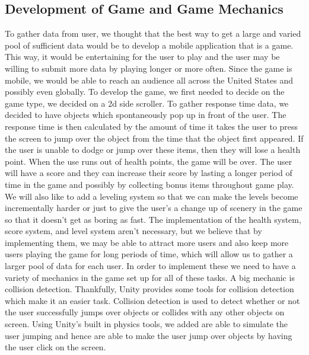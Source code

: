 \documentclass[a4wide]{article}
\begin{document}
\subsection{Development of Game and Game Mechanics}
\- To gather data from user, we thought that the best way to get a large and varied pool of sufficient data would be to develop a mobile application that is a game. This way, it would be entertaining for the user to play and the user may be willing to submit more data by playing longer or more often. Since the game is mobile, we would be able to reach an audience all across the United States and possibly even globally.\newline
\- To develop the game, we first needed to decide on the game type, we decided on a 2d side scroller. To gather response time data, we decided to have objects which spontaneously pop up in front of the user. The response time is then calculated by the amount of time it takes the user to press the screen to jump over the object from the time that the object first appeared. If the user is unable to dodge or jump over these items, then they will lose a health point. When the use runs out of health points, the game will be over. The user will have a score and they can increase their score by lasting a longer period of time in the game and possibly by collecting bonus items throughout game play. We will also like to add a leveling system so that we can make the levels become incrementally harder or just to give the user's a change up of scenery in the game so that it doesn't get as boring as fast. The implementation of the health system, score system, and level system aren't necessary, but we believe that by implementing them, we may be able to attract more users and also keep more users playing the game for long periods of time, which will allow us to gather a larger pool of data for each user.\newline
\- In order to implement these we need to have a variety of mechanics in the game set up for all of these tasks. A big mechanic is collision detection. Thankfully, Unity provides some tools for collision detection which make it an easier task. Collision detection is used to detect whether or not the user successfully jumps over objects or collides with any other objects on screen. Using Unity's built in physics tools, we added are able to simulate the user jumping and hence are able to make the user jump over objects by having the user click on the screen.
\end{document}
